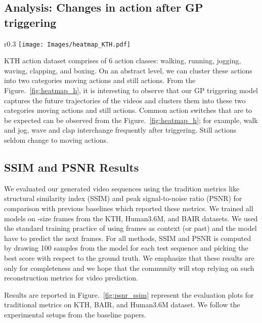 \documentclass{article} \usepackage{iclr2021_conference,times}
\begin{document}
\subsection{Analysis: Changes in action after GP triggering}
\begin{wrapfigure}{r}{0.3\textwidth}
\vspace{-0.7in}
    \centering
     \texttt{[image: Images/heatmap\_KTH.pdf]}
    \caption{\textbf{Changes in action from past frames to future frames} on KTH dataset. Total of 25,000 generated videos were used to calculate percentage change shown in the above figure.}
    \label{fig:heatmap_h}
\end{wrapfigure}
KTH action dataset comprises of 6 action classes: walking, running, jogging, waving, clapping, and boxing. On an abstract level, we can cluster these actions into two categories moving actions and still actions. From the Figure.~\ref{fig:heatmap_h}, it is interesting to observe that our GP triggering model captures the future trajectories of the videos and clusters them into these two categories moving actions and still actions. Common action switches that are to be expected can be observed from the Figure.~\ref{fig:heatmap_h}; for example, walk and jog, wave and clap interchange frequently after triggering. Still actions seldom change to moving actions.

\clearpage

\subsection{SSIM and PSNR Results}
We evaluated our generated video sequences using the tradition metrics like structural similarity index (SSIM) and peak signal-to-noise ratio (PSNR) for comparison with previous baselines which reported these metrics. We trained all models on -size frames from the KTH, Human3.6M, and BAIR datasets. We used the standard training practice of using  frames as context (or past) and the model have to predict the next  frames. For all methods, SSIM and PSNR is computed by drawing 100 samples from the model for each test sequence and picking the best score with respect to the ground truth. We emphasize that these results are only for completeness and we hope that the community will stop relying on such reconstruction metrics for video prediction.

Results are reported in Figure.~\ref{fig:psnr_ssim} represent the evaluation plots for traditional metrics on KTH, BAIR, and Human3.6M dataset. We follow the experimental setups from the baseline papers.
\end{document}
